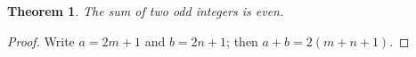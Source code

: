 \documentclass{article}
\newtheorem{thm}{Theorem}
\begin{document}
\begin{thm}
The sum of two odd integers is even.
\end{thm}
\begin{proof}
Write $a = 2m+1$ and $b = 2n+1$; then $a+b = 2(m+n+1)$.
\end{proof}
\end{document}

